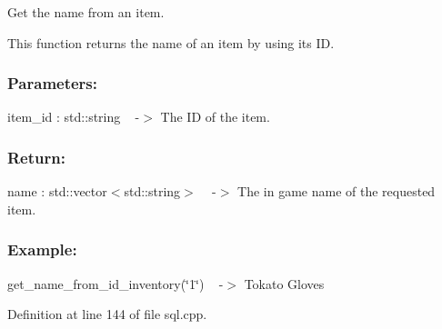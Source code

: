 Get the name from an item. 

This function returns the name of an item by using its ID.~\newline
 \subsubsection*{Parameters\+: }

item\+\_\+id \+: std\+::string ~\newline
-\/$>$ The ID of the item.

\subsubsection*{Return\+: }

name \+: std\+::vector$<$std\+::string$>$ ~\newline
-\/$>$ The in game name of the requested item.

\subsubsection*{Example\+: }

get\+\_\+name\+\_\+from\+\_\+id\+\_\+inventory(\char`\"{}1\char`\"{}) ~\newline
-\/$>$ Tokato Gloves 

Definition at line 144 of file sql.\+cpp.


